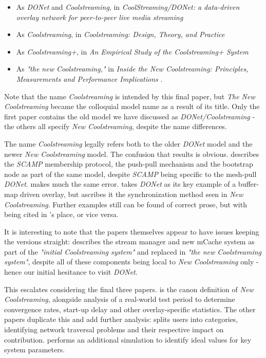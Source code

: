 \documentclass[12pt,a4paper]{article}
\begin{document}
\begin{itemize}
	\item As \textit{DONet} and \textit{Coolstreaming}, in \textit{CoolStreaming/DONet: a data-driven overlay network for peer-to-peer live media streaming} \cite{Zhang2005}
	\item As \textit{Coolstreaming}, in \textit{Coolstreaming: Design, Theory, and Practice} \cite{Xie2007}
	\item As \textit{Coolstreaming+}, in \textit{An Empirical Study of the Coolstreaming+ System} \cite{Li2007}
	\item As \textit{"the new Coolstreaming,"} in \textit{Inside the New Coolstreaming: Principles, Measurements and Performance Implications} \cite{Li2008}.
\end{itemize}

Note that the name \textit{Coolstreaming} is intended by this final paper, but \textit{The New Coolstreaming} became the colloquial model name as a result of its title. Only the first paper contains the old model we have discussed as \textit{DONet/Coolstreaming} - the others all specify \textit{New Coolstreaming}, despite the name differences.

The name \textit{Coolstreaming} legally refers both to the older \textit{DONet} model and the newer \textit{New Coolstreaming} model. The confusion that results is obvious. \cite{Kondo2014} describes the \textit{SCAMP} membership protocol, the push-pull mechanism and the bootstrap node as part of the same model, despite \textit{SCAMP} being specific to the mesh-pull \textit{DONet}. \cite{Beraldi2010} makes much the same error. \cite{Lan2011} takes \textit{DONet} as its key example of a buffer-map driven overlay, but ascribes it the synchronization method seen in \textit{New Coolstreaming}. Further examples still can be found of correct prose, but with \cite{Xie2007} being cited in \cite{Zhang2005}'s place, or vice versa.

It is interesting to note that the papers themselves appear to have issues keeping the versions straight:  \cite{Li2008} describes the stream manager and new mCache system as part of the \textit{"initial Coolstreaming system"} and replaced in \textit{"the new Coolstreaming system"}, despite all of these components being local to \textit{New Coolstreaming} only - hence our initial hesitance to visit \textit{DONet}.

This escalates considering the final three papers. \cite{Xie2007} is the canon definition of \textit{New Coolstreaming}, alongside analysis of a real-world test period to determine convergence rates, start-up delay and other overlay-specific statistics. The other papers duplicate this and add further analysis: \cite{Li2007} splits users into categories, identifying network traversal problems and their respective impact on contribution. \cite{Li2008} performs an additional simulation to identify ideal values for key system parameters.
\end{document}
